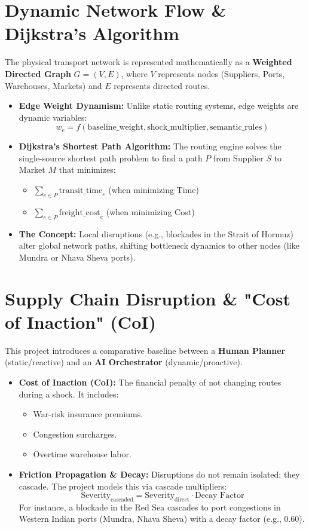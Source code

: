 \section{Dynamic Network Flow \& Dijkstra’s Algorithm}
The physical transport network is represented mathematically as a \textbf{Weighted Directed Graph} $G = (V, E)$, where $V$ represents nodes (Suppliers, Ports, Warehouses, Markets) and $E$ represents directed routes.

\begin{itemize}
    \item \textbf{Edge Weight Dynamism:} Unlike static routing systems, edge weights are dynamic variables:
    \[w_{e} = f(\text{baseline\_weight}, \text{shock\_multiplier}, \text{semantic\_rules})\]
    \item \textbf{Dijkstra’s Shortest Path Algorithm:} 
    The routing engine solves the single-source shortest path problem to find a path $P$ from Supplier $S$ to Market $M$ that minimizes:
    \begin{itemize}
        \item $\sum_{e \in P} \text{transit\_time}_e$ (when minimizing Time)
        \item $\sum_{e \in P} \text{freight\_cost}_e$ (when minimizing Cost)
    \end{itemize}
    \item \textbf{The Concept:} Local disruptions (e.g., blockades in the Strait of Hormuz) alter global network paths, shifting bottleneck dynamics to other nodes (like Mundra or Nhava Sheva ports).
\end{itemize}

\section{Supply Chain Disruption \& "Cost of Inaction" (CoI)}
This project introduces a comparative baseline between a \textbf{Human Planner} (static/reactive) and an \textbf{AI Orchestrator} (dynamic/proactive).

\begin{itemize}
    \item \textbf{Cost of Inaction (CoI):} The financial penalty of not changing routes during a shock. It includes:
    \begin{itemize}
        \item War-risk insurance premiums.
        \item Congestion surcharges.
        \item Overtime warehouse labor.
    \end{itemize}
    \item \textbf{Friction Propagation \& Decay:} 
    Disruptions do not remain isolated; they cascade. The project models this via cascade multipliers:
    \[\text{Severity}_{\text{cascaded}} = \text{Severity}_{\text{direct}} \cdot \text{Decay Factor}\]
    For instance, a blockade in the Red Sea cascades to port congestions in Western Indian ports (Mundra, Nhava Sheva) with a decay factor (e.g., 0.60).
\end{itemize}


